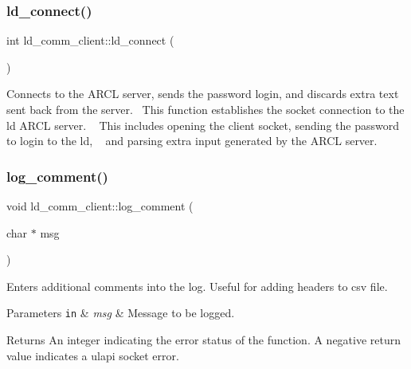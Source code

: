 \subsubsection{\texorpdfstring{ld\+\_\+connect()}{ld\_connect()}}
{\footnotesize\ttfamily int ld\+\_\+comm\+\_\+client\+::ld\+\_\+connect (\begin{DoxyParamCaption}{ }\end{DoxyParamCaption})}

Connects to the A\+R\+CL server, sends the password login, and discards extra text sent back from the server.~\newline
 This function establishes the socket connection to the ld A\+R\+CL server. ~\newline
This includes opening the client socket, sending the password to login to the ld, ~\newline
and parsing extra input generated by the A\+R\+CL server. ~\newline
\mbox{\label{classld__comm__client_a8e2124bb6da72ba99ab9d713510e2303}} 
\subsubsection{\texorpdfstring{log\+\_\+comment()}{log\_comment()}}
{\footnotesize\ttfamily void ld\+\_\+comm\+\_\+client\+::log\+\_\+comment (\begin{DoxyParamCaption}\item[{char $\ast$}]{msg }\end{DoxyParamCaption})}

Enters additional comments into the log. Useful for adding headers to csv file. 
\begin{DoxyParams}[1]{Parameters}
\mbox{\tt in}  & {\em msg} & Message to be logged. \\
\hline
\end{DoxyParams}
\begin{DoxyReturn}{Returns}
An integer indicating the error status of the function. A negative return value indicates a ulapi socket error. 
\end{DoxyReturn}
\mbox{\label{classld__comm__client_a2b9b335282497b7b52b7f9a0e624ffe9}} 
